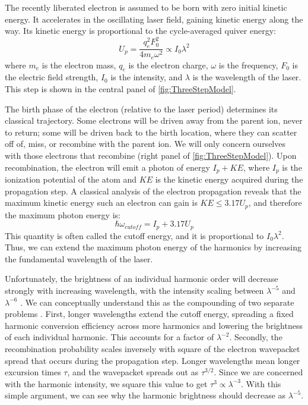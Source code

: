 The recently liberated electron is assumed to be born with zero initial kinetic energy. It accelerates in the oscillating laser field, gaining kinetic energy along the way. Its kinetic energy is proportional to the cycle-averaged quiver energy:
\begin{equation}
U_p = \frac{q_e^2 F_0^2}{4 m_e \omega^2} \propto I_0 \lambda^2
\label{eqn:Up}
\end{equation}
where $m_e$ is the electron mass, $q_e$ is the electron charge, $\omega$ is the frequency, $F_0$ is the electric field strength, $I_0$ is the intensity, and $\lambda$ is the wavelength of the laser. This step is shown in the central panel of \cref{fig:ThreeStepModel}.

The birth phase of the electron (relative to the laser period) determines its classical trajectory. Some electrons will be driven away from the parent ion, never to return; some will be driven back to the birth location, where they can scatter off of, miss, or recombine with the parent ion. We will only concern ourselves with those electrons that recombine (right panel of \cref{fig:ThreeStepModel}). Upon recombination, the electron will emit a photon of energy $I_p + KE$, where $I_p$ is the ionization potential of the atom and $KE$ is the kinetic energy acquired during the propagation step. A classical analysis of the electron propagation reveals that the maximum kinetic energy such an electron can gain is $KE \le 3.17 U_p$, and therefore the maximum photon energy is: 
\begin{equation}
\hbar \omega_{cutoff} = I_p + 3.17 U_p
\label{eqn:cutoff_energy}
\end{equation}
This quantity is often called the cutoff energy, and it is proportional to $I_0 \lambda^2$. Thus, we can extend the maximum photon energy of the harmonics by increasing the fundamental wavelength of the laser.

Unfortunately, the brightness of an individual harmonic order will decrease strongly with increasing wavelength, with the intensity scaling between $\lambda^{-5}$ and $\lambda^{-6}$ \cite{tateScalingWavePacketDynamics2007,shinerWavelengthScalingHigh2009}. We can conceptually understand this as the compounding of two separate problems \cite{lewensteinTheoryHighharmonicGeneration1994}. First, longer wavelengths extend the cutoff energy, spreading a fixed harmonic conversion efficiency across more harmonics and lowering the brightness of each individual harmonic. This accounts for a factor of $\lambda^{-2}$. Secondly, the recombination probability scales inversely with square of the electron wavepacket spread that occurs during the propagation step. Longer wavelengths mean longer excursion times $\tau$, and the wavepacket spreads out as $\tau^{3/2}$. Since we are concerned with the harmonic intensity, we square this value to get $\tau^3 \propto \lambda^{-3}$. With this simple argument, we can see why the harmonic brightness should decrease as $\lambda^{-5}$.

